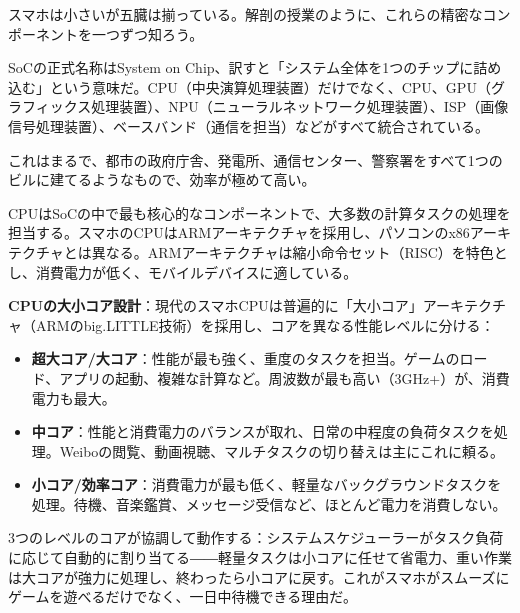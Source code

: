 


スマホは小さいが五臓は揃っている。解剖の授業のように、これらの精密なコンポーネントを一つずつ知ろう。


SoCの正式名称はSystem on Chip、訳すと「システム全体を1つのチップに詰め込む」という意味だ。CPU（中央演算処理装置）だけでなく、CPU、GPU（グラフィックス処理装置）、NPU（ニューラルネットワーク処理装置）、ISP（画像信号処理装置）、ベースバンド（通信を担当）などがすべて統合されている。

これはまるで、都市の政府庁舎、発電所、通信センター、警察署をすべて1つのビルに建てるようなもので、効率が極めて高い。


CPUはSoCの中で最も核心的なコンポーネントで、大多数の計算タスクの処理を担当する。スマホのCPUはARMアーキテクチャを採用し、パソコンのx86アーキテクチャとは異なる。ARMアーキテクチャは縮小命令セット（RISC）を特色とし、消費電力が低く、モバイルデバイスに適している。

\textbf{CPUの大小コア設計}：現代のスマホCPUは普遍的に「大小コア」アーキテクチャ（ARMのbig.LITTLE技術）を採用し、コアを異なる性能レベルに分ける：

\begin{itemize}
  \item \textbf{超大コア/大コア}：性能が最も強く、重度のタスクを担当。ゲームのロード、アプリの起動、複雑な計算など。周波数が最も高い（3GHz+）が、消費電力も最大。
  \item \textbf{中コア}：性能と消費電力のバランスが取れ、日常の中程度の負荷タスクを処理。Weiboの閲覧、動画視聴、マルチタスクの切り替えは主にこれに頼る。
  \item \textbf{小コア/効率コア}：消費電力が最も低く、軽量なバックグラウンドタスクを処理。待機、音楽鑑賞、メッセージ受信など、ほとんど電力を消費しない。
\end{itemize}

3つのレベルのコアが協調して動作する：システムスケジューラーがタスク負荷に応じて自動的に割り当てる――軽量タスクは小コアに任せて省電力、重い作業は大コアが強力に処理し、終わったら小コアに戻す。これがスマホがスムーズにゲームを遊べるだけでなく、一日中待機できる理由だ。

